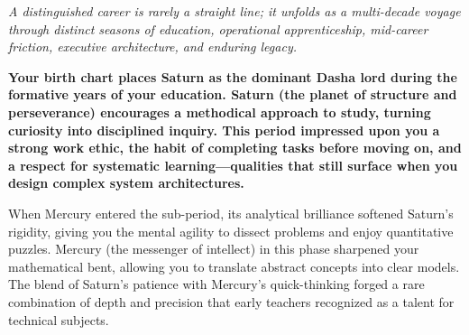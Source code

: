 


{\fontsize{9.5}{14}\selectfont\color{DeepSlate}\itshape A distinguished career is rarely a straight line; it unfolds as a multi-decade voyage through distinct seasons of education, operational apprenticeship, mid-career friction, executive architecture, and enduring legacy.}\par\vspace{3.5mm}

\label{topic37}

{\fontsize{9.5}{13.8}\selectfont\bfseries\color{DeepSlate} Your birth chart places Saturn as the dominant Dasha lord during the formative years of your education. Saturn (the planet of structure and perseverance) encourages a methodical approach to study, turning curiosity into disciplined inquiry. This period impressed upon you a strong work ethic, the habit of completing tasks before moving on, and a respect for systematic learning---qualities that still surface when you design complex system architectures.}\par\vspace{2mm}

{\fontsize{9}{13}\selectfont When Mercury entered the sub-period, its analytical brilliance softened Saturn's rigidity, giving you the mental agility to dissect problems and enjoy quantitative puzzles. Mercury (the messenger of intellect) in this phase sharpened your mathematical bent, allowing you to translate abstract concepts into clear models. The blend of Saturn's patience with Mercury's quick-thinking forged a rare combination of depth and precision that early teachers recognized as a talent for technical subjects.}\par\vspace{1.8mm}


